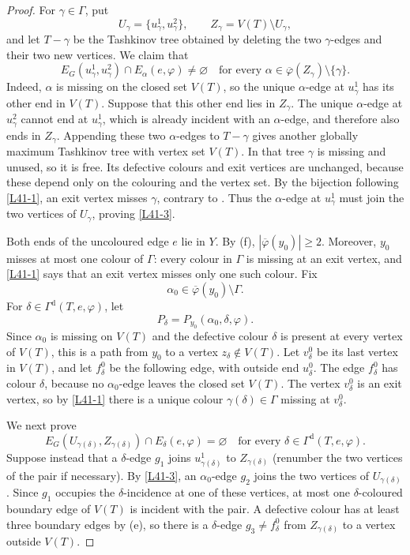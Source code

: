 \documentclass[11pt]{article}
\theoremstyle{definition}
\newcommand{\Dcol}{\Gamma^{\mathrm d}}
\newcommand{\set}[1]{\{#1\}}
\newcommand{\comp}{\mathbin{\setminus}}
\begin{document}
\begin{proof}
For $\gamma\in\Gamma$, put
\[
 U_\gamma=\set{u^1_\gamma,u^2_\gamma},
 \qquad
 Z_\gamma=V(T)\comp U_\gamma,
\]
and let $T-\gamma$ be the Tashkinov tree obtained by deleting the two
$\gamma$-edges and their two new vertices. We claim that
\begin{equation}
 E_G(u^1_\gamma,u^2_\gamma)\cap E_\alpha(e,\varphi)
 \ne\varnothing
 \quad
 \text{for every }\alpha\in\overline\varphi(Z_\gamma)
                 \comp\set{\gamma}.
 \tag{3}\label{L41-3}
\end{equation}
Indeed, $\alpha$ is missing on the closed set $V(T)$, so the unique
$\alpha$-edge at $u^1_\gamma$ has its other end in $V(T)$. Suppose that
this other end lies in $Z_\gamma$. The unique $\alpha$-edge at
$u^2_\gamma$ cannot end at $u^1_\gamma$, which is already incident with
an $\alpha$-edge, and therefore also ends in $Z_\gamma$. Appending these
two $\alpha$-edges to $T-\gamma$ gives another globally maximum Tashkinov
tree with vertex set $V(T)$. In that tree $\gamma$ is missing and unused,
so it is free. Its defective colours and exit vertices are unchanged,
because these depend only on the colouring and the vertex set. By the
bijection following \eqref{L41-1}, an exit vertex misses $\gamma$, contrary
to . Thus the $\alpha$-edge at $u^1_\gamma$ must join
the two vertices of $U_\gamma$, proving \eqref{L41-3}.

Both ends of the uncoloured edge $e$ lie in $Y$. By
(f), $|\overline\varphi(y_0)|\ge2$. Moreover,
$y_0$ misses at most one colour of $\Gamma$: every colour in $\Gamma$ is
missing at an exit vertex, and \eqref{L41-1} says that an exit vertex
misses only one such colour. Fix
\[
 \alpha_0\in\overline\varphi(y_0)\comp\Gamma.
\]
For $\delta\in\Dcol(T,e,\varphi)$, let
\[
 P_\delta=P_{y_0}(\alpha_0,\delta,\varphi).
\]
Since $\alpha_0$ is missing on $V(T)$ and the defective colour $\delta$ is
present at every vertex of $V(T)$, this is a path from $y_0$ to a vertex
$z_\delta\notin V(T)$. Let $v^0_\delta$ be its last vertex in $V(T)$,
and let $f^0_\delta$ be the following edge, with outside end
$u^0_\delta$. The edge $f^0_\delta$ has colour $\delta$, because no
$\alpha_0$-edge leaves the closed set $V(T)$. The vertex $v^0_\delta$ is
an exit vertex, so by \eqref{L41-1} there is a unique colour
$\gamma(\delta)\in\Gamma$ missing at $v^0_\delta$.

We next prove
\begin{equation}
 E_G(U_{\gamma(\delta)},Z_{\gamma(\delta)})
       \cap E_\delta(e,\varphi)=\varnothing
 \quad\text{for every }\delta\in\Dcol(T,e,\varphi).
 \tag{4}\label{L41-4}
\end{equation}
Suppose instead that a $\delta$-edge $g_1$ joins
$u^1_{\gamma(\delta)}$ to $Z_{\gamma(\delta)}$ (renumber the two vertices
of the pair if necessary). By \eqref{L41-3}, an $\alpha_0$-edge $g_2$
joins the two vertices of $U_{\gamma(\delta)}$. Since $g_1$ occupies the
$\delta$-incidence at one of these vertices, at most one
$\delta$-coloured boundary edge of $V(T)$ is incident with the pair. A
defective colour has at least three boundary edges by
(e), so there is a $\delta$-edge
$g_3\ne f^0_\delta$ from $Z_{\gamma(\delta)}$ to a vertex outside
$V(T)$.


\end{proof}
\end{document}
